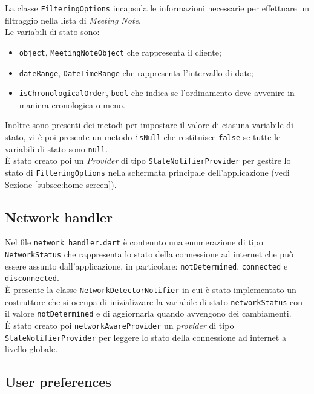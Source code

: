 La classe \lstinline{FilteringOptions} incapsula le informazioni necessarie per effettuare un filtraggio nella lista di \emph{Meeting Note}.\\
Le variabili di stato sono:
\begin{itemize}
    \item \lstinline{object}, \lstinline{MeetingNoteObject} che rappresenta il \gls{cliente}\glsoccur;
    \item \lstinline{dateRange}, \lstinline{DateTimeRange} che rappresenta l'intervallo di date;
    \item \lstinline{isChronologicalOrder}, \lstinline{bool} che indica se l'ordinamento deve avvenire in maniera cronologica o meno.
\end{itemize}
Inoltre sono presenti dei metodi per impostare il valore di ciasuna variabile di stato, vi è poi presente un metodo \lstinline{isNull} che restituisce \lstinline{false} se tutte le variabili di stato sono \lstinline{null}. \\
È stato creato poi un \emph{Provider} di tipo \lstinline{StateNotifierProvider} \cite{site:state-notifier-provider} per gestire lo stato di \lstinline{FilteringOptions} nella schermata principale dell'applicazione (vedi Sezione \ref{subsec:home-screen}).

\subsection{Network handler}
\label{subsec:network-handler}

Nel file \lstinline{network_handler.dart} è contenuto una enumerazione di tipo \lstinline{NetworkStatus} che rappresenta lo stato della connessione ad internet che può essere assunto dall'applicazione, in particolare: \lstinline{notDetermined}, \lstinline{connected} e \lstinline{disconnected}. \\
È presente la classe \lstinline{NetworkDetectorNotifier} in cui è stato implementato un costruttore che si occupa di inizializzare la variabile di stato \lstinline{networkStatus} con il valore \lstinline{notDetermined} e di aggiornarla quando avvengono dei cambiamenti. \\
È stato creato poi \lstinline{networkAwareProvider} un \emph{provider} di tipo \lstinline{StateNotifierProvider} \cite{site:state-notifier-provider} per leggere lo stato della connessione ad internet a livello globale.

\subsection{User preferences}
\label{subsec:shared-preferences}

